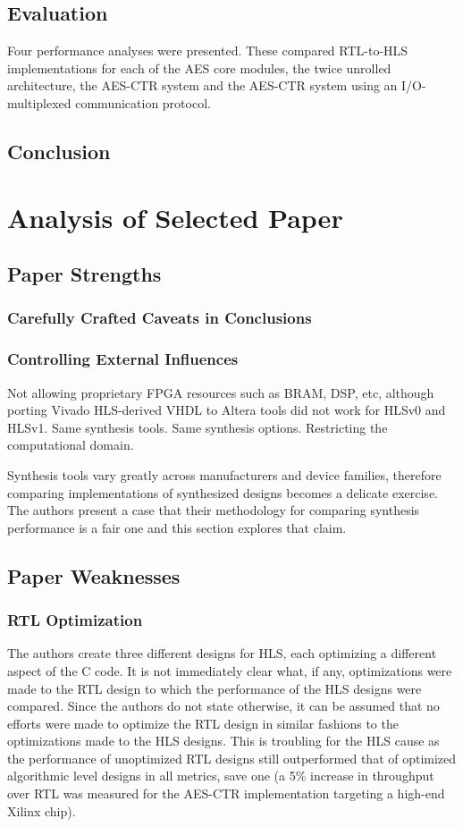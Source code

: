 \documentclass[onecolumn]{article}
\begin{document}
\subsection{Evaluation}

Four performance analyses were presented. These compared RTL-to-HLS implementations for each of the AES core modules, the twice unrolled architecture, the AES-CTR system and the AES-CTR system using an I/O-multiplexed communication protocol. 

\subsection{Conclusion}
\section{Analysis of Selected Paper}
\subsection{Paper Strengths}
\subsubsection{Carefully Crafted Caveats in Conclusions}
\subsubsection{Controlling External Influences}
Not allowing proprietary FPGA resources such as BRAM, DSP, etc, although porting Vivado HLS-derived VHDL to Altera tools did not work for HLSv0 and HLSv1.
Same synthesis tools.
Same synthesis options.
Restricting the computational domain.

Synthesis tools vary greatly across manufacturers and device families, therefore comparing implementations of synthesized designs becomes a delicate exercise. The authors present a case that their methodology for comparing synthesis performance is a fair one and this section explores that claim.

\subsection{Paper Weaknesses}\label{sec:weaknesses}
\subsubsection{RTL Optimization}
The authors create three different designs for HLS, each optimizing a different aspect of the C code. It is not immediately clear what, if any, optimizations were made to the RTL design to which the performance of the HLS designs were compared. Since the authors do not state otherwise, it can be assumed that no efforts were made to optimize the RTL design in similar fashions to the optimizations made to the HLS designs. This is troubling for the HLS cause as the performance of unoptimized RTL designs still outperformed that of optimized algorithmic level designs in all metrics, save one (a 5\% increase in throughput over RTL was measured for the AES-CTR implementation targeting a high-end Xilinx chip).
\end{document}
